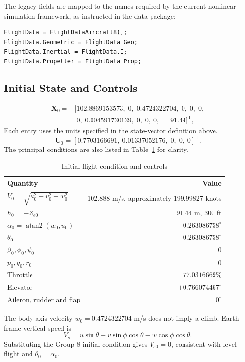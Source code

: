 \documentclass[a4paper,11pt]{article}
\begin{document}
The legacy fields are mapped to the names required by the current nonlinear simulation framework, as instructed in the data package:
\begin{lstlisting}
FlightData = FlightDataAircraft8();
FlightData.Geometric = FlightData.Geo;
FlightData.Inertial = FlightData.I;
FlightData.Propeller = FlightData.Prop;
\end{lstlisting}
\subsection{Initial State and Controls}
\begin{equation}
\begin{aligned}
\bm X_0={}&[102.8869153573,\;0,\;0.4724322704,\;0,\;0,\;0,\\
 &\phantom{[}0,\;0.004591730139,\;0,\;0,\;0,\;-91.44]^{\mathsf T},
\end{aligned}
\end{equation}
Each entry uses the units specified in the state-vector definition above.
\begin{equation}
\bm U_0=[0.7703166691,\;0.01337052176,\;0,\;0,\;0]^{\mathsf T}.
\end{equation}
The principal conditions are also listed in Table~\ref{tab:trimpoint} for clarity.
\begin{table}[H]\centering
\caption{Initial flight condition and controls}\label{tab:trimpoint}
\begin{tabular}{lr}\toprule
Quantity&Value\\\midrule
$V_0=\sqrt{u_0^2+v_0^2+w_0^2}$&102.888 m/s, approximately 199.99827 knots\\
$h_0=-Z_{e0}$&91.44 m, 300 ft\\
$\alpha_0=\operatorname{atan2}(w_0,u_0)$&$0.263086758^\circ$\\
$\theta_0$&$0.263086758^\circ$\\
$\beta_0,\phi_0,\psi_0$&$0$\\
$p_0,q_0,r_0$&$0$\\
Throttle&$77.0316669\%$\\
Elevator&$+0.766074467^\circ$\\
Aileron, rudder and flap&$0^\circ$\\\bottomrule
\end{tabular}
\end{table}

The body-axis velocity $w_0=0.4724322704$ m/s does not imply a climb. Earth-frame vertical speed is
\begin{equation}\label{eq:vs}
V_s=u\sin\theta-v\sin\phi\cos\theta-w\cos\phi\cos\theta.
\end{equation}
Substituting the Group 8 initial condition gives $V_{s0}=0$, consistent with level flight and $\theta_0=\alpha_0$.
\end{document}

